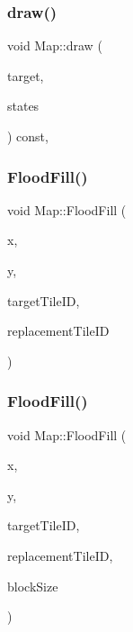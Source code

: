\subsubsection{\texorpdfstring{draw()}{draw()}}
{\footnotesize\ttfamily void Map\+::draw (\begin{DoxyParamCaption}\item[{sf\+::\+Render\+Target \&}]{target,  }\item[{sf\+::\+Render\+States}]{states }\end{DoxyParamCaption}) const\hspace{0.3cm}{\ttfamily [private]}, {\ttfamily [virtual]}}

\mbox{\label{class_map_af2d39f9bcdfea3c79c3670f79fc7f548}} 
\subsubsection{\texorpdfstring{Flood\+Fill()}{FloodFill()}\hspace{0.1cm}{\footnotesize\ttfamily [1/2]}}
{\footnotesize\ttfamily void Map\+::\+Flood\+Fill (\begin{DoxyParamCaption}\item[{int}]{x,  }\item[{int}]{y,  }\item[{int}]{target\+Tile\+ID,  }\item[{int}]{replacement\+Tile\+ID }\end{DoxyParamCaption})}

\mbox{\label{class_map_adeb884ce208e7fca98bb7d6c86c4ace6}} 
\subsubsection{\texorpdfstring{Flood\+Fill()}{FloodFill()}\hspace{0.1cm}{\footnotesize\ttfamily [2/2]}}
{\footnotesize\ttfamily void Map\+::\+Flood\+Fill (\begin{DoxyParamCaption}\item[{int}]{x,  }\item[{int}]{y,  }\item[{int}]{target\+Tile\+ID,  }\item[{int}]{replacement\+Tile\+ID,  }\item[{int}]{block\+Size }\end{DoxyParamCaption})}

